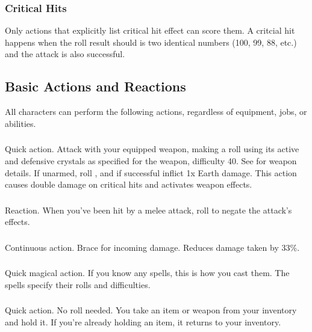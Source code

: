 \begin{multicols}{2}
        \subsubsection{Critical Hits}
            Only actions that explicitly list critical hit effect can score them. A critcial hit happens when the roll result should is two identical numbers (100, 99, 88, etc.) and the attack is also successful.

    \subsection{Basic Actions and Reactions}\label{subsec:basicactions}
        All characters can perform the following actions, regardless of equipment, jobs, or abilities. 

        \subsubsection{}
            Quick action. Attack with your equipped weapon, making a roll using its active and defensive crystals as specified for the weapon, difficulty 40. See  for weapon details. If unarmed, roll , and if successful inflict 1x Earth damage. This action causes double damage on critical hits and activates weapon effects.

        \subsubsection{}
            Reaction. When you've been hit by a melee attack, roll  to negate the attack's effects.

        \subsubsection{}
            Continuous action. Brace for incoming damage. Reduces damage taken by 33\%.

        \subsubsection{}
            Quick magical action. If you know any spells, this is how you cast them. The spells specify their rolls and difficulties.

        \subsubsection{}
            Quick action. No roll needed. You take an item or weapon from your inventory and hold it. If you're already holding an item, it returns to your inventory.


\end{multicols}
